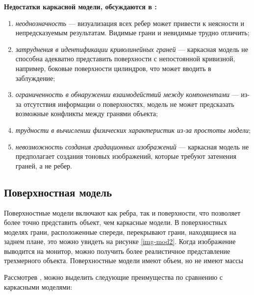 \textbf{Недостатки каркасной модели, обсуждаются в \cite{model_geom_01}:}
\begin{enumerate}
      \item \textit{неоднозначность} --- визуализация всех ребер может привести к неясности и непредсказуемым результатам. Видимые грани и невидимые трудно отличить;
      \item \textit{затруднения в идентификации криволинейных граней} --- каркасная модель не способна адекватно представить поверхности с непостоянной кривизной, например, боковые поверхности цилиндров, что может вводить в заблуждение;
      \item \textit{ограниченность в обнаружении взаимодействий между компонентами} --- из-за отсутствия информации о поверхностях, модель не может предсказать возможные конфликты между гранями объекта; 
    		
    \item \textit{трудности в вычислении физических характеристик из-за простоты модели};
   	\item \textit{невозможность создания градационных изображений} --- каркасная модель не предполагает создания тоновых изображений, которые требуют затенения граней, а не ребер.
\end{enumerate}
   

  

\subsection{Поверхностная модель}

Поверхностные модели включают как ребра, так и поверхности, что позволяет более точно представить объект, чем каркасные модели. В поверхностных моделях грани, расположенные спереди, перекрывают грани, находящиеся на заднем плане, это можно увидеть на рисунке \ref{img-mod2}. Когда изображение выводится на монитор, можно получить более реалистичное представление трехмерного объекта. Поверхностные модели имеют объем, но не имеют массы \cite{model_geom}

Рассмотрев \cite{model_geom_01}, можно выделить следующие преимущества по сравнению с каркасными моделями:


